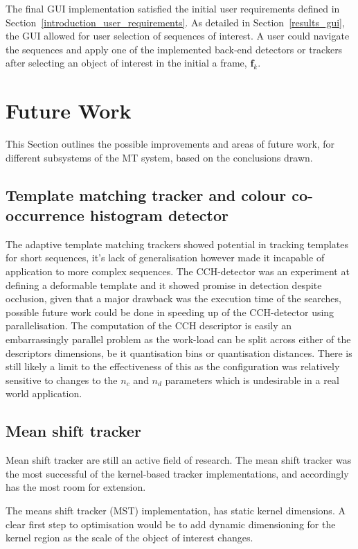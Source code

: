 The final GUI implementation satisfied the initial user requirements defined in
Section~\ref{introduction_user_requirements}. As detailed in
Section~\ref{results_gui}, the GUI allowed for user selection of sequences of
interest. A user could navigate the sequences and apply one of the implemented
back-end detectors or trackers after selecting an object of interest in the
initial a frame, $\mathbf{f}_k$.


\section{Future Work}\label{future}
This Section outlines the possible improvements and areas
of future work, for different subsystems of the MT system, based on the
conclusions drawn.

\subsection{Template matching tracker and colour co-occurrence histogram
detector}
The adaptive template matching trackers showed potential in tracking templates for
short sequences, it's lack of generalisation however made it incapable of
application to more complex sequences. 
The CCH-detector was an experiment at defining a deformable template
and it showed promise in detection despite occlusion, given that a major
drawback was the execution time of the searches, possible future work could be
done in speeding up of the CCH-detector using parallelisation. The computation
of the CCH descriptor is easily an embarrassingly parallel problem as the
work-load can be split across either of the descriptors dimensions, be it
quantisation bins or quantisation distances. 
There is still likely a limit to the effectiveness of this as the configuration
was relatively sensitive to changes to the $n_c$ and $n_d$ parameters which is
undesirable in a real world application.

\subsection{Mean shift tracker}
Mean shift tracker are still an active field of research. The mean shift tracker
was the most successful of the kernel-based tracker implementations, and
accordingly has the most room for extension.

The means shift tracker (MST) implementation, has static kernel dimensions. A clear first
step to optimisation would be to add dynamic dimensioning for the kernel region
as the scale of the object of interest changes.

